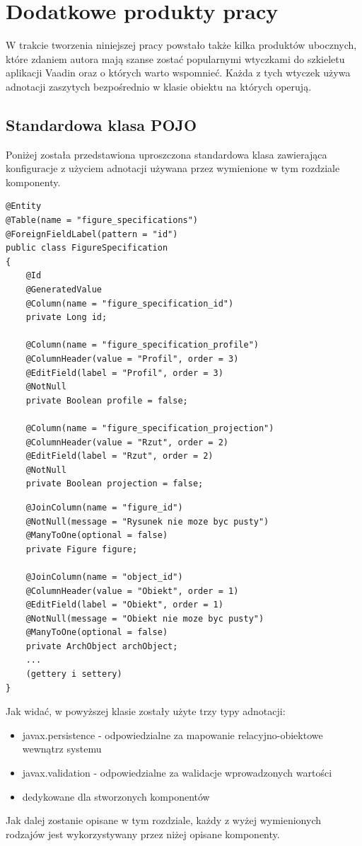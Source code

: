 \chapter{Dodatkowe produkty pracy}
W trakcie tworzenia niniejszej pracy powstało także kilka produktów ubocznych, które zdaniem autora mają szanse zostać popularnymi wtyczkami do szkieletu aplikacji Vaadin oraz o których warto wspomnieć. Każda z tych wtyczek używa adnotacji zaszytych bezpośrednio w klasie obiektu na których operują.

\section{Standardowa klasa POJO}
Poniżej została przedstawiona uproszczona standardowa klasa zawierająca konfiguracje z użyciem adnotacji używana przez wymienione w tym rozdziale komponenty.
\begin{lstlisting}
@Entity
@Table(name = "figure_specifications")
@ForeignFieldLabel(pattern = "id")
public class FigureSpecification
{
	@Id
	@GeneratedValue
	@Column(name = "figure_specification_id")
	private Long id;

	@Column(name = "figure_specification_profile")
	@ColumnHeader(value = "Profil", order = 3)
	@EditField(label = "Profil", order = 3)
	@NotNull
	private Boolean profile = false;

	@Column(name = "figure_specification_projection")
	@ColumnHeader(value = "Rzut", order = 2)
	@EditField(label = "Rzut", order = 2)
	@NotNull
	private Boolean projection = false;
\end{lstlisting}
\newpage
\begin{lstlisting}
	@JoinColumn(name = "figure_id")
	@NotNull(message = "Rysunek nie moze byc pusty")
	@ManyToOne(optional = false)
	private Figure figure;

	@JoinColumn(name = "object_id")
	@ColumnHeader(value = "Obiekt", order = 1)
	@EditField(label = "Obiekt", order = 1)
	@NotNull(message = "Obiekt nie moze byc pusty")
	@ManyToOne(optional = false)
	private ArchObject archObject;
	...
	(gettery i settery)
}
\end{lstlisting}
Jak widać, w powyższej klasie zostały użyte trzy typy adnotacji:
\begin{itemize}
\item javax.persistence - odpowiedzialne za mapowanie relacyjno-obiektowe wewnątrz systemu
\item javax.validation - odpowiedzialne za walidacje wprowadzonych wartości
\item dedykowane dla stworzonych komponentów
\end{itemize}
Jak dalej zostanie opisane w tym rozdziale, każdy z wyżej wymienionych rodzajów jest wykorzystywany przez niżej opisane komponenty.

